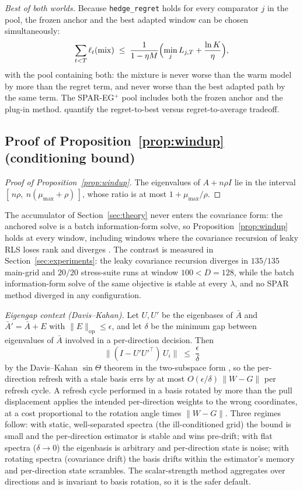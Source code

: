 \medskip
\noindent\emph{Best of both worlds.}
Because \texttt{hedge\_regret} holds for every comparator $j$ in the pool, the frozen anchor and the best adapted window can be chosen simultaneously:
\[
  \sum_{t<T} \ell_t(\mathrm{mix}) \;\le\; \frac{1}{1-\eta M}\Bigl(\min_j L_{j,T} + \frac{\ln K}{\eta}\Bigr),
\]
with the pool containing both: the mixture is never worse than the warm model by more than the regret term, and never worse than the best adapted path by the same term. The SPAR-EG$^+$ pool includes both the frozen anchor and the plug-in method.
\citet{evendar2008} quantify the regret-to-best versus regret-to-average tradeoff.

\subsection{Proof of Proposition~\ref{prop:windup} (conditioning bound)}
\label{app:proof-props}



\begin{proof}[Proof of Proposition~\ref{prop:windup}]
The eigenvalues of $A + n\rho I$ lie in the interval $[\,n\rho,\ n(\mu_{\max} + \rho)\,]$, whose ratio is at most $1 + \mu_{\max}/\rho$.
\end{proof}

The accumulator of Section~\ref{sec:theory} never enters the covariance form: the anchored solve is a batch information-form solve, so Proposition~\ref{prop:windup} holds at every window, including windows where the covariance recursion of leaky RLS loses rank and diverges \citep{sayed2008}.
The contrast is measured in Section~\ref{sec:experiments}: the leaky covariance recursion diverges in $135/135$ main-grid and $20/20$ stress-suite runs at window $100 < D = 128$, while the batch information-form solve of the same objective is stable at every $\lambda$, and no SPAR method diverged in any configuration.

\medskip
\noindent\emph{Eigengap context (Davis--Kahan).}
Let $U, U'$ be the eigenbases of $\bar A$ and $\bar A' = \bar A + E$ with $\|E\|_{\mathrm{op}} \le \epsilon$, and let $\delta$ be the minimum gap between eigenvalues of $\bar A$ involved in a per-direction decision.
Then
\[
  \bigl\|(I - U'U'^\top)\,U_i\bigr\| \;\le\; \frac{\epsilon}{\delta}
\]
by the Davis--Kahan $\sin\Theta$ theorem in the two-subspace form \citep{davis1970,wedin1972}, so the per-direction refresh with a stale basis errs by at most $O(\epsilon/\delta)\,\|W - G\|$ per refresh cycle.
A refresh cycle performed in a basis rotated by more than the pull displacement applies the intended per-direction weights to the wrong coordinates, at a cost proportional to the rotation angle times $\|W - G\|$.
Three regimes follow: with static, well-separated spectra (the ill-conditioned grid) the bound is small and the per-direction estimator is stable and wins pre-drift; with flat spectra ($\delta \to 0$) the eigenbasis is arbitrary and per-direction state is noise; with rotating spectra (covariance drift) the basis drifts within the estimator's memory and per-direction state scrambles.
The scalar-strength method aggregates over directions and is invariant to basis rotation, so it is the safer default.

